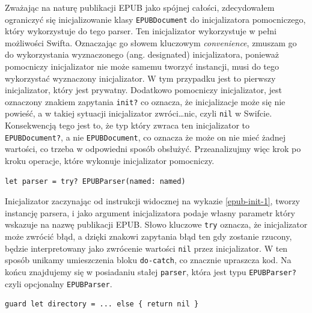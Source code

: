 Zważając na naturę publikacji EPUB jako spójnej całości, zdecydowałem ograniczyć się inicjalizowanie klasy \texttt{EPUBDocument} do inicjalizatora pomocniczego, który wykorzystuje do tego parser. Ten inicjalizator wykorzystuje w pełni możliwości Swifta. Oznaczając go słowem kluczowym \textit{convenience}, zmuszam go do wykorzystania wyznaczonego (ang. designated) inicjalizatora, ponieważ pomocniczy inicjalizator nie może samemu tworzyć instancji, musi do tego wykorzystać wyznaczony inicjalizator. W tym przypadku jest to pierwszy inicjalizator, który jest prywatny. Dodatkowo pomocniczy inicjalizator, jest oznaczony znakiem zapytania \texttt{init?} co oznacza, że inicjalizacje może się nie powieść, a w takiej sytuacji inicjalizator zwróci\ldots nic, czyli \texttt{nil} w Swifcie. Konsekwencją tego jest to, że typ który zwraca ten inicjalizator to \texttt{EPUBDocument?}, a nie \texttt{EPUBDocument}, co oznacza że może on nie mieć żadnej wartości, co trzeba w odpowiedni sposób obsłużyć. Przeanalizujmy więc krok po kroku operacje, które wykonuje inicjalizator pomocniczy.

\begin{lstlisting}[language=swift-reference,caption={Inizjalizacja EPUBParser},label={epub-init-1}]
let parser = try? EPUBParser(named: named)
\end{lstlisting}

Inicjalizator zaczynając od instrukcji widocznej na wykazie \ref{epub-init-1}, tworzy instancję parsera, i jako argument inicjalizatora podaje własny parametr który wskazuje na nazwę publikacji EPUB. Słowo kluczowe \texttt{try} oznacza, że inicjalizator może zwrócić błąd, a dzięki znakowi zapytania błąd ten gdy zostanie rzucony, będzie interpretowany jako zwrócenie wartości \texttt{nil} przez inicjalizator. W ten sposób unikamy umieszczenia bloku \texttt{do-catch}, co znacznie upraszcza kod. Na końcu znajdujemy się w posiadaniu stałej \texttt{parser}, która jest typu \texttt{EPUBParser?} czyli opcjonalny \texttt{EPUBParser}.

\begin{lstlisting}[language=swift-reference,caption={Wyrażenie \texttt{guard let}},label={epub-init-2}]
guard let directory = ... else { return nil }
\end{lstlisting}

